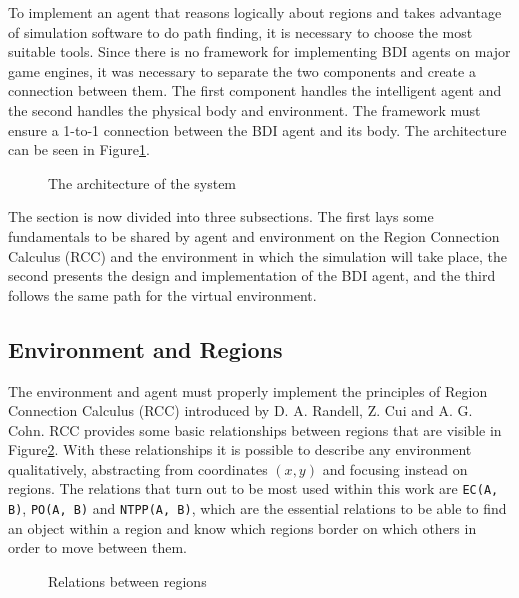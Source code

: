 \label{sec:design_and_implementation}
To implement an agent that reasons logically about regions and takes advantage of simulation software to do path finding, it is necessary to choose the most suitable tools.
Since there is no framework for implementing BDI agents on major game engines, it was necessary to separate the two components and create a connection between them.
The first component handles the intelligent agent and the second handles the physical body and environment. The framework must ensure a 1-to-1 connection between the BDI agent and its body.
The architecture can be seen in Figure\ref{fig:architecture}.

\begin{figure}
    \centering
    
    \label{fig:architecture}
    \caption{The architecture of the system}
\end{figure}

The section is now divided into three subsections. The first lays some fundamentals to be shared by agent and environment on the Region Connection Calculus (RCC) and the environment in which the simulation will take place, the second presents the design and implementation of the BDI agent, and the third follows the same path for the virtual environment.

\subsection{Environment and Regions}
The environment and agent must properly implement the principles of Region Connection Calculus (RCC) introduced by D. A. Randell, Z. Cui and A. G. Cohn\cite{DBLP:conf/kr/RandellCC92}.
RCC provides some basic relationships between regions that are visible in Figure\ref{fig:relations}.
With these relationships it is possible to describe any environment qualitatively, abstracting from coordinates $(x, y)$ and focusing instead on regions.
The relations that turn out to be most used within this work are \texttt{EC(A, B)}, \texttt{PO(A, B)} and \texttt{NTPP(A, B)}, which are the essential relations to be able to find an object within a region and know which regions border on which others in order to move between them.

\begin{figure}
    \centering
    
    \label{fig:relations}
    \caption{Relations between regions}
\end{figure}

